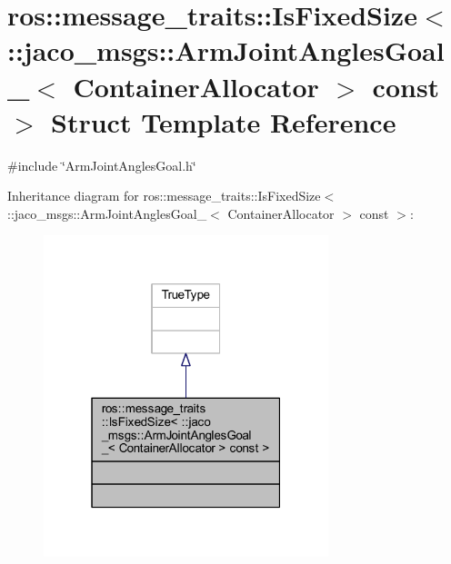 \hypertarget{structros_1_1message__traits_1_1IsFixedSize_3_01_1_1jaco__msgs_1_1ArmJointAnglesGoal___3_01Contaf87d10cae82c072c931f87ba5ed05ab6}{}\section{ros\+:\+:message\+\_\+traits\+:\+:Is\+Fixed\+Size$<$ \+:\+:jaco\+\_\+msgs\+:\+:Arm\+Joint\+Angles\+Goal\+\_\+$<$ Container\+Allocator $>$ const $>$ Struct Template Reference}
\label{structros_1_1message__traits_1_1IsFixedSize_3_01_1_1jaco__msgs_1_1ArmJointAnglesGoal___3_01Contaf87d10cae82c072c931f87ba5ed05ab6}


{\ttfamily \#include \char`\"{}Arm\+Joint\+Angles\+Goal.\+h\char`\"{}}



Inheritance diagram for ros\+:\+:message\+\_\+traits\+:\+:Is\+Fixed\+Size$<$ \+:\+:jaco\+\_\+msgs\+:\+:Arm\+Joint\+Angles\+Goal\+\_\+$<$ Container\+Allocator $>$ const $>$\+:
\nopagebreak
\begin{figure}[H]
\begin{center}
\leavevmode
\includegraphics[width=235pt]{d0/ddf/structros_1_1message__traits_1_1IsFixedSize_3_01_1_1jaco__msgs_1_1ArmJointAnglesGoal___3_01Conta5c4d7ef3a16ada061e41d97688203bd4}
\end{center}
\end{figure}


